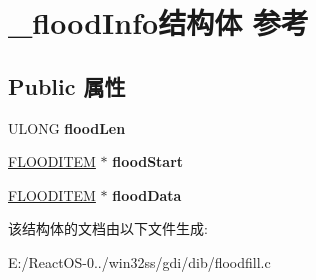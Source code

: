 \hypertarget{struct__flood_info}{}\section{\+\_\+flood\+Info结构体 参考}
\label{struct__flood_info}
\subsection*{Public 属性}
\begin{DoxyCompactItemize}
\item 
\mbox{\label{struct__flood_info_a7d253b1b5dd1bbdc771aef2a7f454063}} 
U\+L\+O\+NG {\bfseries flood\+Len}
\item 
\mbox{\label{struct__flood_info_a87a8d5cf41947ef4d6a161d3a9e6192c}} 
\hyperlink{struct__flood_item}{F\+L\+O\+O\+D\+I\+T\+EM} $\ast$ {\bfseries flood\+Start}
\item 
\mbox{\label{struct__flood_info_a5f14540443d16bc119f7272628c364ae}} 
\hyperlink{struct__flood_item}{F\+L\+O\+O\+D\+I\+T\+EM} $\ast$ {\bfseries flood\+Data}
\end{DoxyCompactItemize}


该结构体的文档由以下文件生成\+:\begin{DoxyCompactItemize}
\item 
E\+:/\+React\+O\+S-\/0../win32ss/gdi/dib/floodfill.\+c\end{DoxyCompactItemize}
